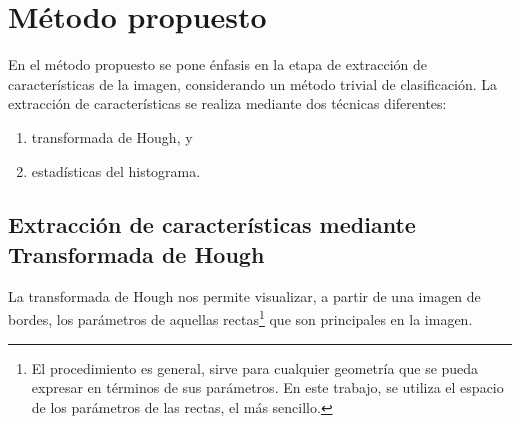 \documentclass[conference,a4paper,10pt,oneside,final]{tfmpd}
\begin{document}
\section{Método propuesto}
En el método propuesto se pone énfasis en la etapa de
extracción de carac\-te\-rís\-ti\-cas de la imagen, considerando
un método trivial de clasificación.
La extracción de características se realiza %
mediante dos técnicas diferentes:
\begin{enumerate}
\item transformada de Hough, y
\item estadísticas del histograma.
\end{enumerate}
%
%
\subsection{Extracción de características mediante Transformada de Hough}
La transformada de Hough nos permite visualizar, a partir de una imagen de
bordes, los parámetros de aquellas rectas\footnote{El procedimiento es general,
sirve para cualquier geometría que se pueda expresar en términos de sus
parámetros. En este trabajo, se utiliza el espacio de los parámetros de las
rectas, el más sencillo.}
que son principales en la imagen.
\end{document}
